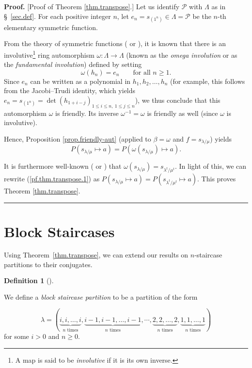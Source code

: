 \documentclass[numbers=enddot,12pt,final,onecolumn,notitlepage]{scrartcl}%
\theoremstyle{definition}
\newtheorem{defi}[theo]{Definition}
\newenvironment{definition}[1][]
{\begin{defi}[#1]\begin{leftbar}}
{\end{leftbar}\end{defi}}
\newenvironment{proof}[1][Proof]{\noindent\textbf{#1.} }{\ \rule{0.5em}{0.5em}}
\renewcommand{\leq}{\leqslant}
\renewcommand{\geq}{\geqslant}
\theoremstyle{plainsl}
\begin{document}
\begin{proof}
[Proof of Theorem \ref{thm.transpose}.] Let us identify $\mathcal{P}$ with
$\Lambda$ as in \S \ \ref{sec.def}. For each positive integer $n$, let
$e_{n}=s_{\left(  1^{n}\right)  }\in\Lambda=\mathcal{P}$ be the $n$-th
elementary symmetric function.

From the theory of symmetric functions (\cite[\S 7.6]{EC2} or \cite[(2.7)]%
{Macdonald}), it is known that there is an involutive\footnote{A map is said
to be \emph{involutive} if it is its own inverse.} ring automorphism
$\omega:\Lambda\rightarrow\Lambda$ (known as the \emph{omega involution} or as
the \emph{fundamental involution}) defined by setting
\[
\omega\left(  h_{n}\right)  =e_{n}\qquad\text{for all }n\geq1.
\]
Since $e_{n}$ can be written as a polynomial in $h_{1},h_{2},\ldots,h_{n}$
(for example, this follows from the Jacobi--Trudi identity, which yields
$e_{n}=s_{\left(  1^{n}\right)  }=\det\left(  h_{1+i-j}\right)  _{1\leq i\leq
n,\ 1\leq j\leq n}$), we thus conclude that this automorphism $\omega$ is
friendly. Its inverse $\omega^{-1}=\omega$ is friendly as well (since $\omega$
is involutive).

Hence, Proposition \ref{prop.friendly-aut} (applied to $\beta=\omega$ and
$f=s_{\lambda/\mu}$) yields%
\begin{equation}
P\left(  s_{\lambda/\mu}\mapsto a\right)  =P\left(  \omega\left(
s_{\lambda/\mu}\right)  \mapsto a\right)  .\label{pf.thm.transpose.1}%
\end{equation}


It is furthermore well-known (\cite[Theorem 7.15.6]{EC2} or \cite[(5.6)]%
{Macdonald}) that $\omega\left(  s_{\lambda/\mu}\right)  =s_{\lambda^{t}%
/\mu^{t}}$. In light of this, we can rewrite (\ref{pf.thm.transpose.1}) as
$P\left(  s_{\lambda/\mu}\mapsto a\right)  =P\left(  s_{\lambda^{t}/\mu^{t}%
}\mapsto a\right)  $. This proves Theorem \ref{thm.transpose}.
\end{proof}


\section{Block Staircases}

Using Theorem~\ref{thm.transpose}, we can extend our results on $n$-staircase
partitions to their conjugates.

\begin{definition}

We define a \emph{block staircase partition} to be a partition of the form 

\[\lambda = ( \underbrace{i,i,\ldots,i}_{n
\text{ times}}
,  \underbrace{i-1,i-1,\ldots,i-1}_{n
\text{ times}}
, \cdots,  \underbrace{2,2,\ldots,2}_{n
\text{ times}}
, \underbrace{1,1,\ldots,1}_{n
\text{ times}}
)
\]
for some $i > 0$ and $n \geq 0$.
\end{definition}
\end{document}

